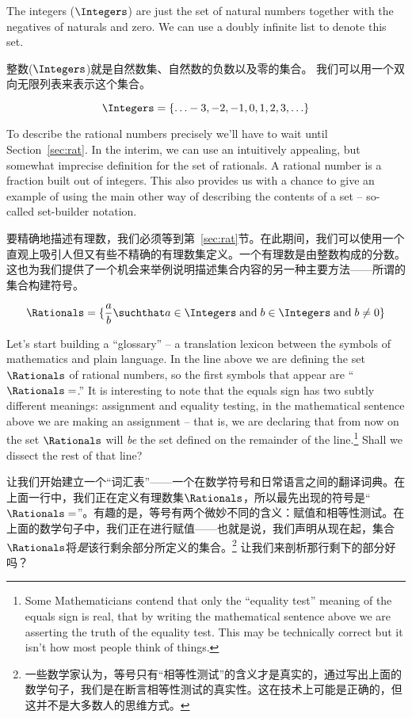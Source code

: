 The  integers ($\Integers$) are just the set of natural numbers
together with the negatives of naturals and zero.
We can use
a doubly infinite list to denote this set.

整数($\Integers$)就是自然数集、自然数的负数以及零的集合。
我们可以用一个双向无限列表来表示这个集合。

\[ \Integers = \{ \ldots -3, -2, -1, 0, 1, 2, 3, \ldots \} \]


To describe the  rational numbers precisely we'll have to wait until Section~\ref{sec:rat}. In the interim, we can use an intuitively appealing, but somewhat imprecise
definition for the set of rationals. A rational number is a fraction built out
of integers.   This also provides us with
a chance to give an example of using the main other way of describing
the contents of a set -- so-called  set-builder notation.

要精确地描述有理数，我们必须等到第~\ref{sec:rat}节。在此期间，我们可以使用一个直观上吸引人但又有些不精确的有理数集定义。一个有理数是由整数构成的分数。这也为我们提供了一个机会来举例说明描述集合内容的另一种主要方法——所谓的集合构建符号。

\[ \Rationals = \{ \frac{a}{b} \suchthat a \in \Integers \; \mbox{and} \;
b \in \Integers \; \mbox{and} \; b \neq 0 \} \]

Let's start building a ``glossary'' -- a translation lexicon
between the symbols of mathematics and plain language. In the line
above we are defining the set $\Rationals$ of rational numbers, so the
first symbols that appear are ``$\Rationals =$.''  It is interesting to 
note that the equals sign has two subtly different meanings: assignment
and equality testing,  in the mathematical sentence above we are
making an assignment -- that is, we are declaring that from now on the set
$\Rationals$ will {\em be} the set defined on the remainder of the
line.\footnote{Some Mathematicians contend that only the ``equality
  test'' meaning of the equals sign is real, that by writing the
  mathematical sentence above we are asserting the truth of 
the
  equality test.  This may be technically correct but it isn't how
  most people think of things.}  
Shall we dissect the rest of that line?

让我们开始建立一个“词汇表”——一个在数学符号和日常语言之间的翻译词典。在上面一行中，我们正在定义有理数集$\Rationals$，所以最先出现的符号是“$\Rationals =$”。有趣的是，等号有两个微妙不同的含义：赋值和相等性测试。在上面的数学句子中，我们正在进行赋值——也就是说，我们声明从现在起，集合$\Rationals$将{\em 是}该行剩余部分所定义的集合。\footnote{一些数学家认为，等号只有“相等性测试”的含义才是真实的，通过写出上面的数学句子，我们是在断言相等性测试的真实性。这在技术上可能是正确的，但这并不是大多数人的思维方式。} 让我们来剖析那行剩下的部分好吗？

